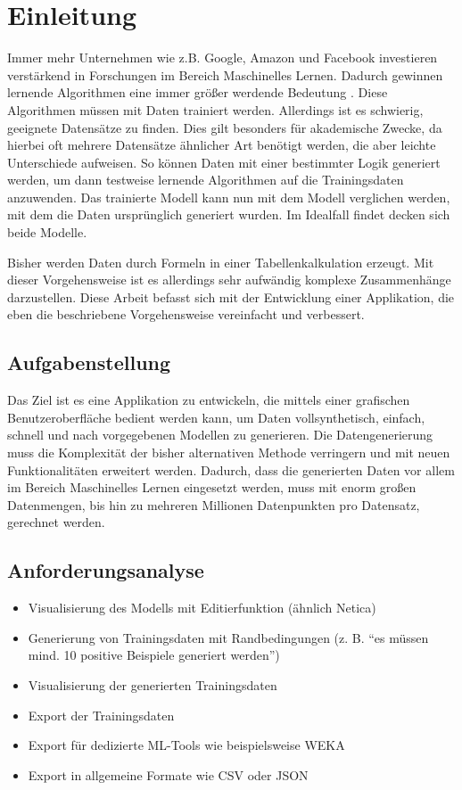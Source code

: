 
\chapter{Einleitung}

Immer mehr Unternehmen wie z.B. Google, Amazon und Facebook investieren verstärkend in Forschungen im Bereich Maschinelles Lernen. Dadurch gewinnen lernende Algorithmen eine immer größer werdende Bedeutung \cite{mengesonnentag:2018}. Diese Algorithmen müssen mit Daten trainiert werden. Allerdings ist es schwierig, geeignete Datensätze zu finden. Dies gilt besonders für akademische Zwecke, da hierbei oft mehrere Datensätze ähnlicher Art benötigt werden, die aber leichte Unterschiede aufweisen. So können Daten mit einer bestimmter Logik generiert werden, um dann testweise lernende Algorithmen auf die Trainingsdaten anzuwenden. Das trainierte Modell kann nun mit dem Modell verglichen werden, mit dem die Daten ursprünglich generiert wurden. Im Idealfall findet decken sich beide Modelle.

Bisher werden Daten durch Formeln in einer Tabellenkalkulation erzeugt. Mit dieser Vorgehensweise ist es allerdings sehr aufwändig komplexe Zusammenhänge darzustellen. Diese Arbeit befasst sich mit der Entwicklung einer Applikation, die eben die beschriebene Vorgehensweise vereinfacht und verbessert.

\section{Aufgabenstellung}

Das Ziel ist es eine Applikation zu entwickeln, die mittels einer grafischen Benutzeroberfläche bedient werden kann, um Daten vollsynthetisch, einfach, schnell und nach vorgegebenen Modellen zu generieren. Die Datengenerierung muss die Komplexität der bisher alternativen Methode verringern und mit neuen Funktionalitäten erweitert werden. Dadurch, dass die generierten Daten vor allem im Bereich Maschinelles Lernen eingesetzt werden, muss mit enorm großen Datenmengen, bis hin zu mehreren Millionen Datenpunkten pro Datensatz, gerechnet werden.

\section{Anforderungsanalyse}
\label{sec:anforderungsanalyse}

\begin{itemize}
    \item Visualisierung des Modells mit Editierfunktion (ähnlich Netica)
    \item Generierung von Trainingsdaten mit Randbedingungen (z. B. \enquote{es müssen mind. 10 positive Beispiele generiert werden})
    \item Visualisierung der generierten Trainingsdaten
    \item Export der Trainingsdaten
    \item Export für dedizierte ML-Tools wie beispielsweise WEKA
    \item Export in allgemeine Formate wie CSV oder JSON 
\end{itemize}

